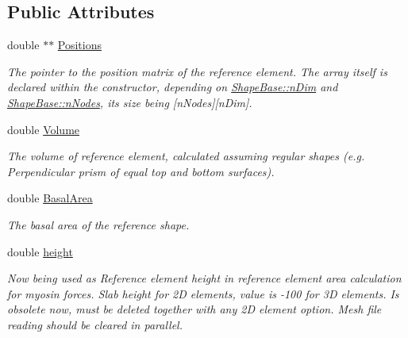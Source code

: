 \subsection*{Public Attributes}
\begin{DoxyCompactItemize}
\item 
\hypertarget{classReferenceShapeBase_a745e71ff73ef758708f39a4b3b1be4d1}{}double $\ast$$\ast$ \hyperlink{classReferenceShapeBase_a745e71ff73ef758708f39a4b3b1be4d1}{Positions}\label{classReferenceShapeBase_a745e71ff73ef758708f39a4b3b1be4d1}

\begin{DoxyCompactList}\small\item\em The pointer to the position matrix of the reference element. The array itself is declared within the constructor, depending on \hyperlink{classShapeBase_a250bd3396546342c8104f5b9c180d18f}{Shape\+Base\+::n\+Dim} and \hyperlink{classShapeBase_ae7dd93b58b3281ce90025f83d0f0e976}{Shape\+Base\+::n\+Nodes}, its size being \mbox{[}n\+Nodes\mbox{]}\mbox{[}n\+Dim\mbox{]}. \end{DoxyCompactList}\item 
\hypertarget{classReferenceShapeBase_a12d2d0c2511f4f1357360ff61910ac02}{}double \hyperlink{classReferenceShapeBase_a12d2d0c2511f4f1357360ff61910ac02}{Volume}\label{classReferenceShapeBase_a12d2d0c2511f4f1357360ff61910ac02}

\begin{DoxyCompactList}\small\item\em The volume of reference element, calculated assuming regular shapes (e.\+g. Perpendicular prism of equal top and bottom surfaces). \end{DoxyCompactList}\item 
\hypertarget{classReferenceShapeBase_a214b89b970efa7a290dbe1533cf237ea}{}double \hyperlink{classReferenceShapeBase_a214b89b970efa7a290dbe1533cf237ea}{Basal\+Area}\label{classReferenceShapeBase_a214b89b970efa7a290dbe1533cf237ea}

\begin{DoxyCompactList}\small\item\em The basal area of the reference shape. \end{DoxyCompactList}\item 
\hypertarget{classReferenceShapeBase_a76ac694d1b1276f6847bee3c3efa84b0}{}double \hyperlink{classReferenceShapeBase_a76ac694d1b1276f6847bee3c3efa84b0}{height}\label{classReferenceShapeBase_a76ac694d1b1276f6847bee3c3efa84b0}

\begin{DoxyCompactList}\small\item\em Now being used as Reference element height in reference element area calculation for myosin forces. Slab height for 2\+D elements, value is -\/100 for 3\+D elements. Is obsolete now, must be deleted together with any 2\+D element option. Mesh file reading should be cleared in parallel. \end{DoxyCompactList}\end{DoxyCompactItemize}

